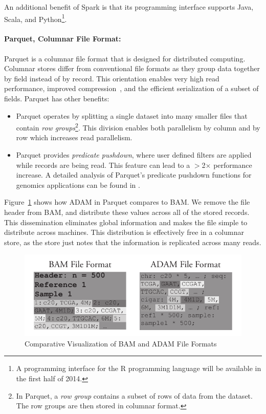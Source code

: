 \documentclass{bioinfo}
\begin{document}
An additional benefit of Spark is that its programming interface supports Java, Scala, and Python\footnote{A programming interface for the R programming language will
be available in the first half of 2014.}.

\paragraph{Parquet, Columnar File Format:}
\label{sec:parquet}

Parquet is a columnar file format that is designed for distributed computing. Columnar stores differ from conventional file formats as they group data together
by field instead of by record. This orientation enables very high read performance, improved compression~\citep[see][]{abadi06}, and the efficient serialization of a subset
of fields. Parquet has other benefits:

\begin{itemize}
\item Parquet operates by splitting a single dataset into many smaller files that contain \emph{row groups}\footnote{In Parquet, a \emph{row group} contains a subset
of rows of data from the dataset. The row groups are then stored in columnar format.}. This division enables both parallelism by column and by row which increases read
parallelism.
\item Parquet provides \emph{predicate pushdown}, where user defined filters are applied while records are being read. This feature can lead to a $>$2$\times$ performance increase.
A detailed analysis of Parquet's predicate pushdown functions for genomics applications can be found in \citet{massie13}.
\end{itemize}

Figure~\ref{fig:file-format} shows how ADAM in Parquet compares to BAM. We remove the file header from BAM, and distribute these values across all of the stored
records. This dissemination eliminates global information and makes the file simple to distribute across machines. This distribution is effectively free in a columnar store,
as the store just notes that the information is replicated across many reads.

\begin{figure}[h]
\begin{center}
\includegraphics[width=\linewidth]{file-format.pdf}
\end{center}
\caption{Comparative Visualization of BAM and ADAM File Formats}
\label{fig:file-format}
\end{figure}
\end{document}
